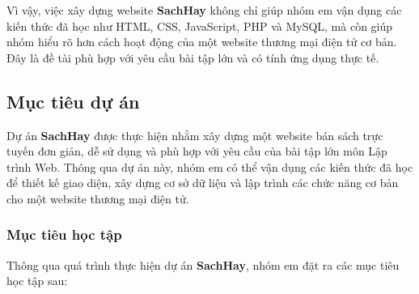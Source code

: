 Vì vậy, việc xây dựng website \textbf{SachHay} không chỉ giúp nhóm em vận dụng các kiến thức đã học như HTML, CSS, JavaScript, PHP và MySQL, mà còn giúp nhóm hiểu rõ hơn cách hoạt động của một website thương mại điện tử cơ bản. Đây là đề tài phù hợp với yêu cầu bài tập lớn và có tính ứng dụng thực tế.


\subsection{Mục tiêu dự án}

Dự án \textbf{SachHay} được thực hiện nhằm xây dựng một website bán sách trực tuyến đơn giản, dễ sử dụng và phù hợp với yêu cầu của bài tập lớn môn Lập trình Web. Thông qua dự án này, nhóm em có thể vận dụng các kiến thức đã học để thiết kế giao diện, xây dựng cơ sở dữ liệu và lập trình các chức năng cơ bản cho một website thương mại điện tử.

\subsubsection{Mục tiêu học tập}

Thông qua quá trình thực hiện dự án \textbf{SachHay}, nhóm em đặt ra các mục tiêu học tập sau:

